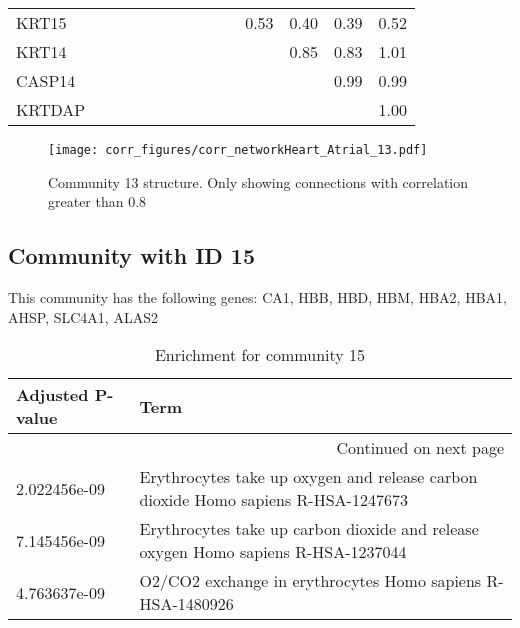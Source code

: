 \begin{longtable}{lrrrrrrrrrrrrr}
KRT15     &           &              &              &            &            &            &             &                 &             &        0.53 &         0.40 &         0.39 &       0.52 \\
KRT14     &           &              &              &            &            &            &             &                 &             &             &         0.85 &         0.83 &       1.01 \\
CASP14    &           &              &              &            &            &            &             &                 &             &             &              &         0.99 &       0.99 \\
KRTDAP    &           &              &              &            &            &            &             &                 &             &             &              &              &       1.00 \\
\end{longtable}


\begin{figure}[h!]
\centering
\texttt{[image: corr\_figures/corr\_networkHeart\_Atrial\_13.pdf]}
\caption{Community 13 structure. Only showing connections with correlation greater than 0.8}
\end{figure}




\subsection*{Community with ID 15}
This community has the following genes: CA1, HBB, HBD, HBM, HBA2, HBA1, AHSP, SLC4A1, ALAS2
\\
\begin{longtable}{p{2.4cm}p{14.5cm}}
\caption{Enrichment for community 15}\\
\toprule
Adjusted \newline P-value &                                                                               Term \\
\midrule
\endhead
\midrule
\multicolumn{2}{r}{{Continued on next page}} \\
\midrule
\endfoot

\bottomrule
\endlastfoot
             2.022456e-09 &  Erythrocytes take up oxygen and release carbon dioxide Homo sapiens R-HSA-1247673 \\
             7.145456e-09 &  Erythrocytes take up carbon dioxide and release oxygen Homo sapiens R-HSA-1237044 \\
             4.763637e-09 &                         O2/CO2 exchange in erythrocytes Homo sapiens R-HSA-1480926 \\
\end{longtable}


